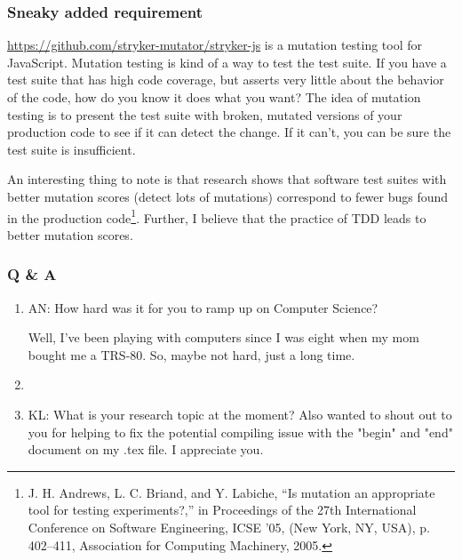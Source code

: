\subsubsection{Sneaky added requirement}
\url{https://github.com/stryker-mutator/stryker-js} is a mutation testing tool for JavaScript.
Mutation testing is kind of a way to test the test suite.
If you have a test suite that has high code coverage, but asserts very little about the behavior of the code, how do you know it does what you want?
The idea of mutation testing is to present the test suite with broken, mutated versions of your production code to see if it can detect the change.
If it can't, you can be sure the test suite is insufficient.

An interesting thing to note is that research shows that software test suites with better mutation scores (detect lots of mutations) correspond to fewer bugs found in the production code\footnote{J. H. Andrews, L. C. Briand, and Y. Labiche, ``Is mutation an appropriate tool for testing experiments?,'' in Proceedings of the 27th International Conference on Software Engineering, ICSE ’05, (New York, NY, USA), p. 402–411, Association for Computing Machinery, 2005.}.
Further, I believe that the practice of TDD leads to better mutation scores.

\subsubsection{Q \& A}
\begin{enumerate}
    \item AN: How hard was it for you to ramp up on Computer Science?

    Well, I've been playing with computers since I was eight when my mom bought me a TRS-80.
    So, maybe not hard, just a long time.
    \item
    
    \item KL: What is your research topic at the moment? Also wanted to shout out to you for helping to fix the potential compiling issue with the "begin" and "end" document on my .tex file. I appreciate you.
\end{enumerate}
